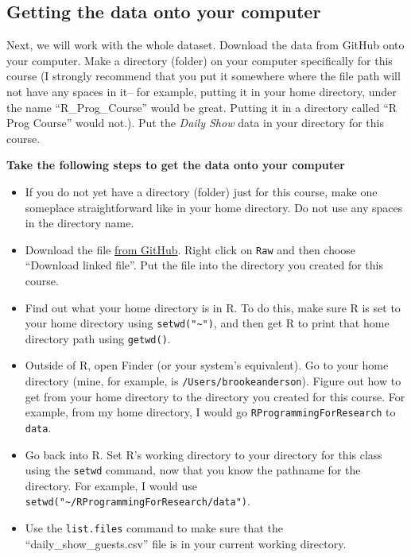 \documentclass[]{book}
\providecommand{\tightlist}{%
  \setlength{\itemsep}{0pt}\setlength{\parskip}{0pt}}
\theoremstyle{definition}
\theoremstyle{definition}
\theoremstyle{definition}
\theoremstyle{remark}
\begin{document}
\subsection{Getting the data onto your
computer}\label{getting-the-data-onto-your-computer}

Next, we will work with the whole dataset. Download the data from GitHub
onto your computer. Make a directory (folder) on your computer
specifically for this course (I strongly recommend that you put it
somewhere where the file path will not have any spaces in it-- for
example, putting it in your home directory, under the name
``R\_Prog\_Course'' would be great. Putting it in a directory called ``R
Prog Course'' would not.). Put the \emph{Daily Show} data in your
directory for this course.

\textbf{Take the following steps to get the data onto your computer}

\begin{itemize}
\tightlist
\item
  If you do not yet have a directory (folder) just for this course, make
  one someplace straightforward like in your home directory. Do not use
  any spaces in the directory name.
\item
  Download the file
  \href{https://github.com/geanders/RProgrammingForResearch/blob/master/data/daily_show_guests.csv}{from
  GitHub}. Right click on \texttt{Raw} and then choose ``Download linked
  file''. Put the file into the directory you created for this course.
\item
  Find out what your home directory is in R. To do this, make sure R is
  set to your home directory using \texttt{setwd("\textasciitilde{}")},
  and then get R to print that home directory path using
  \texttt{getwd()}.
\item
  Outside of R, open Finder (or your system's equivalent). Go to your
  home directory (mine, for example, is \texttt{/Users/brookeanderson}).
  Figure out how to get from your home directory to the directory you
  created for this course. For example, from my home directory, I would
  go \texttt{RProgrammingForResearch} to \texttt{data}.
\item
  Go back into R. Set R's working directory to your directory for this
  class using the \texttt{setwd} command, now that you know the pathname
  for the directory. For example, I would use
  \texttt{setwd("\textasciitilde{}/RProgrammingForResearch/data")}.
\item
  Use the \texttt{list.files} command to make sure that the
  ``daily\_show\_guests.csv'' file is in your current working directory.
\end{itemize}
\end{document}
